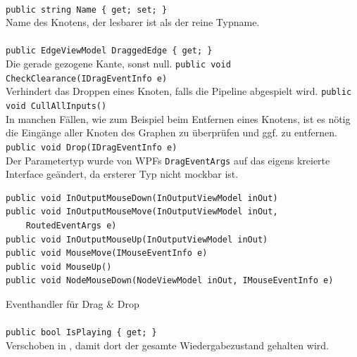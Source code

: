 \paragraph{}
\begin{itemize}
	\add \verb!public string Name { get; set; }! \\
	Name des Knotens, der lesbarer ist als der reine Typname.
\end{itemize}

\paragraph{}
\begin{itemize}
	\add \verb!public EdgeViewModel DraggedEdge { get; }! \\
	Die gerade gezogene Kante, sonst null.
	\add \verb!public void CheckClearance(IDragEventInfo e)! \\
	Verhindert das Droppen eines Knoten, falls die Pipeline abgespielt wird.
	\add \verb!public void CullAllInputs()! \\
	In manchen Fällen, wie zum Beispiel beim Entfernen eines Knotens, ist es nötig die Eingänge aller Knoten des Graphen zu überprüfen und ggf. zu entfernen.
	\change \verb!public void Drop(IDragEventInfo e)! \\
	Der Parametertyp wurde von WPFs \verb!DragEventArgs! auf das eigens kreierte Interface  geändert, da ersterer Typ nicht mockbar ist.
	\add \begin{verbatim}
public void InOutputMouseDown(InOutputViewModel inOut)
public void InOutputMouseMove(InOutputViewModel inOut,
    RoutedEventArgs e)
public void InOutputMouseUp(InOutputViewModel inOut)
public void MouseMove(IMouseEventInfo e)
public void MouseUp()
public void NodeMouseDown(NodeViewModel inOut, IMouseEventInfo e)
	\end{verbatim}
	Eventhandler für Drag \& Drop
\end{itemize}

\paragraph{}
\begin{itemize}
	\remove \verb!public bool IsPlaying { get; }! \\
	Verschoben in , damit dort der gesamte Wiedergabezustand gehalten wird.
\end{itemize}

